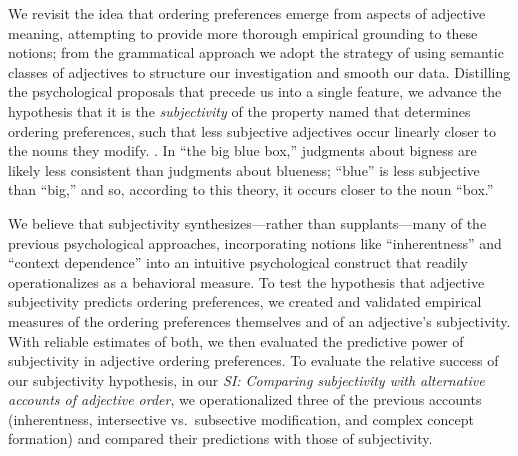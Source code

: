 \documentclass[manuscript]{stjour}
\begin{document}
We revisit the idea that ordering preferences emerge from aspects of adjective meaning, attempting to provide more thorough empirical grounding to these notions;
from the grammatical approach we adopt the strategy of using semantic classes of adjectives to structure our investigation and smooth our data. 
Distilling the psychological proposals that precede us into a single feature, we advance the hypothesis that it is the \emph{subjectivity} of the property named that determines ordering preferences, such that less subjective adjectives occur linearly closer to the nouns they modify. \citep{hetzron1978,Quirk1985,hill2012}. %
In ``the big blue box,'' judgments about bigness are likely less consistent than judgments about blueness; ``blue'' is less subjective than ``big,'' and so, according to this theory, it occurs closer to the noun ``box.'' 

We believe that subjectivity synthesizes---rather than supplants---many of the previous psychological approaches, incorporating notions like ``inherentness'' and ``context dependence'' into an intuitive psychological construct that readily operationalizes as a behavioral measure. 
To test the hypothesis that adjective subjectivity predicts ordering preferences, we created and validated empirical measures of the ordering preferences themselves and of an adjective's subjectivity. With reliable estimates of both, we then evaluated the predictive power of subjectivity in adjective ordering preferences. {To evaluate the relative success of our subjectivity hypothesis, in our \emph{SI: Comparing subjectivity with alternative accounts of adjective order}, we operationalized three of the  previous accounts (inherentness, intersective vs.~subsective modification, and complex concept formation) and compared their predictions with those of subjectivity.}   %
\end{document}
